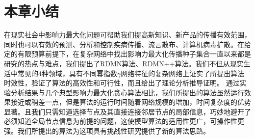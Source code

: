 \section{本章小结}
在现实社会中影响力最大化问题可帮助我们提高新知识、新产品的传播有效范围，同时也可以有效的预测、分析和控制疾病传播、流言散布、计算机病毒扩散。在给定的有限预算前提下，在复杂网络中找出影响力最大化传播种子集合一直以来都是研究的热点与难点，我们提出了RDMN算法、RDMN++算法。我们不但从现实生活中常见的4种领域，具有不同幂指数$\gamma$网络特征的复杂网络上证实了所提出算法时效性，验证了算法的高效性和可行性，而且给出了理论分析推导证明。
通过实验分析结果与几个典型影响力最大化贪心算法相比，我们所提出的算法虽然运行效果接近或稍差一点，但是算法的运行时间随着网络规模的增加，时间复杂度的优势显著。且我们只需知道选择节点及其直接连接邻居节点的局部信息，巧妙地避开了必须知道全局节点信息为前提的问题，这使模型算法的适用性更广，可操作性更强。我们所提出的算法为这项具有挑战性研究提供了新的算法思路。